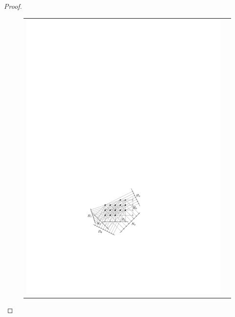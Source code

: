 \documentclass{ws-ijcga}
\begin{document}
\begin{proof}
\begin{figure}
  \begin{center}
    \begin{tabular}{c@{}c}
       \hspace{-1cm}\includegraphics{i4a.pdf} & 

\end{tabular}
\end{center}
\end{figure}
\end{proof}
\end{document}
